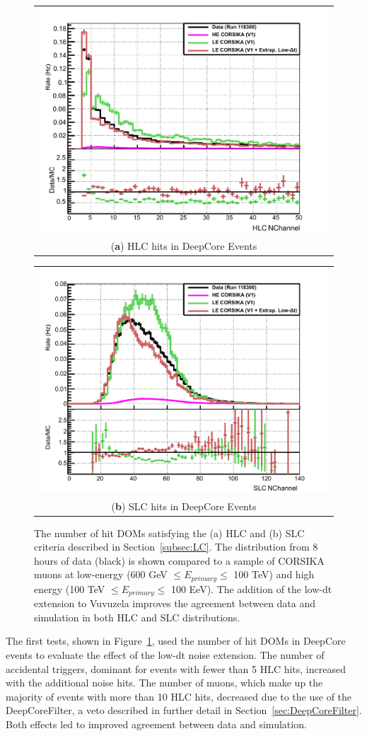 \begin{figure}[h]
\centering
\begin{tabular}[b]{c}
  \includegraphics[width=0.45\linewidth]{old_HLC_NChannel.pdf} \\
  \small (\textbf{\color{ctcolormain}a}) HLC hits in DeepCore Events
\end{tabular} \hspace{2pt}
\begin{tabular}[b]{c}
  \includegraphics[width=0.45\linewidth]{old_SLC_NChannel.pdf} \\
  \small (\textbf{\color{ctcolormain}b}) SLC hits in DeepCore Events
\end{tabular}
\caption[HLC and SLC number of hit DOMs with Vuvuzela V1]{The number of hit DOMs satisfying the (a) HLC and (b) SLC criteria described in Section~\ref{subsec:LC}. The distribution from 8 hours of data (black) is shown compared to a sample of CORSIKA muons at low-energy (600 GeV $\leq E_{primary} \leq$ 100 TeV) and high energy (100 TeV $\leq E_{primary} \leq$ 100 EeV). The addition of the low-dt extension to Vuvuzela improves the agreement between data and simulation in both HLC and SLC distributions.}
\label{fig:uncalibrated_nchannel}
\end{figure}

The first tests, shown in Figure~\ref{fig:uncalibrated_nchannel}, used the number of hit DOMs in DeepCore events to evaluate the effect of the low-dt noise extension.
The number of accidental triggers, dominant for events with fewer than 5 HLC hits, increased with the additional noise hits.
The number of muons, which make up the majority of events with more than 10 HLC hits, decreased due to the use of the DeepCoreFilter, a veto described in further detail in Section~\ref{sec:DeepCoreFilter}.
Both effects led to improved agreement between data and simulation.

